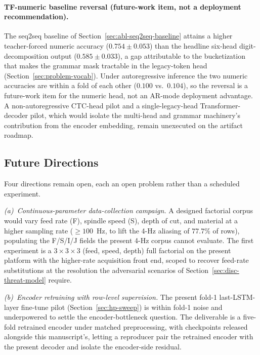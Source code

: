 \documentclass[sensors,article,submit,moreauthors,pdftex]{Definitions/mdpi}
\begin{document}
\paragraph{TF-numeric baseline reversal (future-work item, not a deployment recommendation).} The seq2seq baseline of Section~\ref{sec:abl-seq2seq-baseline} attains a higher teacher-forced numeric accuracy ($0.754 \pm 0.053$) than the headline six-head digit-decomposition output ($0.585 \pm 0.033$), a gap attributable to the bucketization that makes the grammar mask tractable in the legacy-token head (Section~\ref{sec:problem-vocab}). Under autoregressive inference the two numeric accuracies are within a fold of each other ($0.100$ vs.\ $0.104$), so the reversal is a future-work item for the numeric head, not an AR-mode deployment advantage. A non-autoregressive CTC-head pilot and a single-legacy-head Transformer-decoder pilot, which would isolate the multi-head and grammar machinery's contribution from the encoder embedding, remain unexecuted on the artifact roadmap.

\subsection{Future Directions}
\label{sec:roadmap}

Four directions remain open, each an open problem rather than a scheduled experiment.

\emph{(a)~Continuous-parameter data-collection campaign.} A designed factorial corpus would vary feed rate (F), spindle speed (S), depth of cut, and material at a higher sampling rate ($\geq\!100$~Hz, to lift the 4-Hz aliasing of $77.7\%$ of rows), populating the F/S/I/J fields the present 4-Hz corpus cannot evaluate. The first experiment is a $3\!\times\!3\!\times\!3$ (feed, speed, depth) full factorial on the present platform with the higher-rate acquisition front end, scoped to recover feed-rate substitutions at the resolution the adversarial scenarios of Section~\ref{sec:disc-threat-model} require.

\emph{(b)~Encoder retraining with row-level supervision.} The present fold-1 last-LSTM-layer fine-tune pilot (Section~\ref{sec:hp-sweep}) is within fold-1 noise and underpowered to settle the encoder-bottleneck question. The deliverable is a five-fold retrained encoder under matched preprocessing, with checkpoints released alongside this manuscript's, letting a reproducer pair the retrained encoder with the present decoder and isolate the encoder-side residual.
\end{document}
